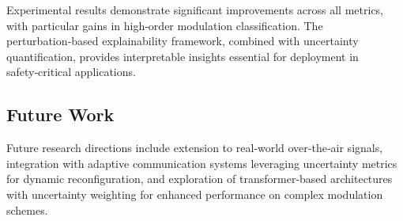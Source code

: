 \documentclass{ELSP}
\begin{document}
Experimental results demonstrate significant improvements across all metrics, with particular gains in high‑order modulation classification. The perturbation‑based explainability framework, combined with uncertainty quantification, provides interpretable insights essential for deployment in safety‑critical applications.

\subsection*{Future Work}
Future research directions include extension to real‑world over‑the‑air signals, integration with adaptive communication systems leveraging uncertainty metrics for dynamic reconfiguration, and exploration of transformer‑based architectures with uncertainty weighting for enhanced performance on complex modulation schemes.
\end{document}
